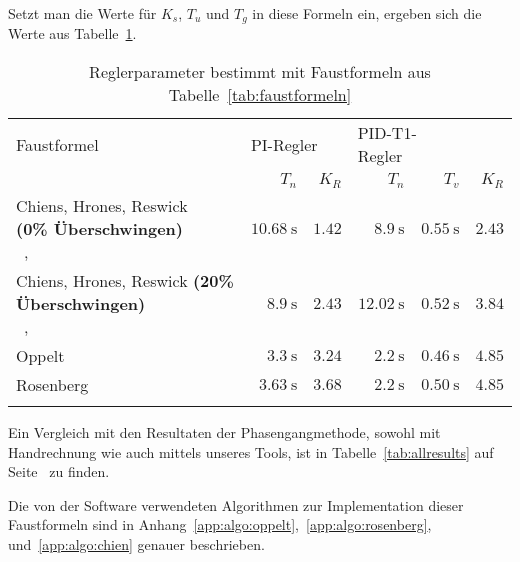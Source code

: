 Setzt man die Werte f\"ur $K_s$, $T_u$ und $T_g$ in diese Formeln ein, ergeben
sich die Werte aus Tabelle~\ref{tab:ff_results}.

\begin{longtable}{p{50mm}rrrrr}
    \toprule


    Faustformel
    &
    \multicolumn{2}{l}{PI-Regler}
    &
    \multicolumn{2}{l}{PID-T1-Regler}
    \\

    &
    $T_n$
    &
    $K_R$
    &
    $T_n$
    &
    $T_v$
    &
    $K_R$
    \\

    \midrule

    \endhead
    \endfoot
    \endlastfoot


    \pbox{45mm}{Chiens, Hrones, Reswick \\ \small{\textbf{(0\% \"Uberschwingen)}} \\~\cite{ref:chiens_tsn},~\cite{ref:chiens_wiki}}
    &
    $\SI{10.68}{\second}$
    &
    $1.42$
    &
    $\SI{8.9}{\second}$
    &
    $\SI{0.55}{\second}$
    &
    $2.43$
    \\

    \addlinespace[1em]

    \pbox{45mm}{Chiens, Hrones, Reswick \small{\textbf{(20\% \"Uberschwingen)}} \\~\cite{ref:chiens_tsn},~\cite{ref:chiens_wiki}}
    &
    $\SI{8.9}{\second}$
    &
    $2.43$
    &
    $\SI{12.02}{\second}$
    &
    $\SI{0.52}{\second}$
    &
    $3.84$
    \\

    \addlinespace[1em]

    Oppelt~\cite{ref:op_ros_zieg}
    &
    $\SI{3.3}{\second}$
    &
    $3.24$
    &
    $\SI{2.2}{\second}$
    &
    $\SI{0.46}{\second}$
    &
    $4.85$
    \\

    \addlinespace[1em]

    Rosenberg~\cite{ref:op_ros_zieg}
    &
    $\SI{3.63}{\second}$
    &
    $3.68$
    &
    $\SI{2.2}{\second}$
    &
    $\SI{0.50}{\second}$
    &
    $4.85$
    \\

    \addlinespace[1em]

    \bottomrule
    \caption{Reglerparameter bestimmt mit Faustformeln aus Tabelle~\ref{tab:faustformeln}}
\label{tab:ff_results}
\end{longtable}

Ein   Vergleich    mit   den   Resultaten   der    Phasengangmethode,   sowohl
mit    Handrechnung    wie    auch    mittels   unseres    Tools,    ist    in
Tabelle~\ref{tab:allresults} auf Seite~\pageref{tab:allresults} zu finden.

Die  von  der  Software  verwendeten  Algorithmen  zur  Implementation  dieser
Faustformeln  sind in  Anhang~\ref{app:algo:oppelt},~\ref{app:algo:rosenberg},
und~\ref{app:algo:chien} genauer beschrieben.
